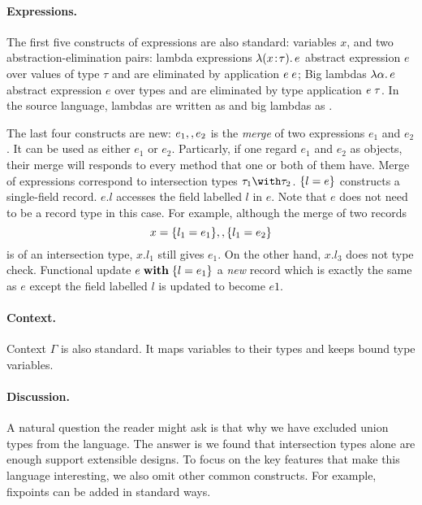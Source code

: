 \paragraph{Expressions.} The first five constructs of expressions are also
standard: variables $ x $, and two abstraction-elimination pairs: lambda
expressions $ \lambda (x \!:\! \tau).\, e $ abstract expression $ e $ over values of
type $ \tau $ and are eliminated by application $ e \; e $; Big lambdas
$ \lambda \alpha.\, e $ abstract expression $ e $ over types and are eliminated by
type application $ e \; \tau $. In the source language, lambdas are written as
 and big lambdas as .

The last four constructs are new: $ e_1 ,, e_2 $ is the \emph{merge} of two
expressions $ e_1 $ and $ e_2 $.
It can be used as either $ e_1 $ or $ e_2 $. Particarly, if one regard $ e_1 $
and $ e_2 $ as objects, their merge will responds to every method that one or
both of them have. Merge of expressions correspond to intersection types
$ \tau_1 \andop \tau_2 $. $ \{ l = e \} $ constructs a single-field record.
$ e.l $ accesses the field labelled $ l $ in $ e $. Note that $ e $ does not
need to be a record type in this case. For example, although the merge of two
records
\[
x = \{ l_1 = e_1 \} ,, \{ l_1 = e_2 \} 
\]
is of an intersection type, $ x.{l_1} $ still gives $ e_1 $. On the other hand,
$ x.{l_3} $ does not type check. Functional update $ e \; \mathbf{with} \; \{l = e_1\} $ a
\emph{new} record which is exactly the same as $ e $ except the field labelled
$ l $ is updated to become $ e1 $.

\paragraph{Context.} Context $ \Gamma $ is also standard. It maps variables to
their types and keeps bound type variables.

\paragraph{Discussion.} A natural question the reader might ask is that why we
have excluded union types from the language. The answer is we found that
intersection types alone are enough support extensible designs. To focus on the
key features that make this language interesting, we also omit other common
constructs. For example, fixpoints can be added in standard ways.

